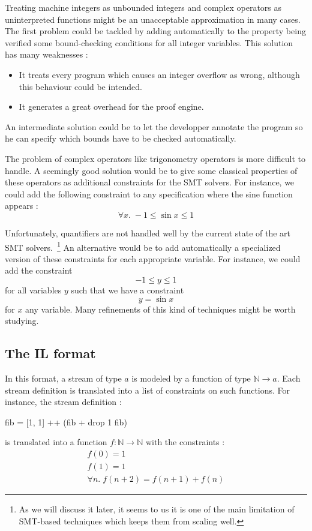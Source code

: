 Treating machine integers as unbounded integers and complex operators as uninterpreted functions might be an unacceptable approximation in many cases. The first problem could be tackled by adding automatically to the property being verified some bound-checking conditions for all integer variables. This solution has many weaknesses :

\begin{itemize}
\item It treats every program which causes an integer overflow as wrong, although this behaviour could be intended.
\item It generates a great overhead for the proof engine.
\end{itemize}

An intermediate solution could be to let the developper annotate the program so he can specify which bounds have to be checked automatically.


\medskip

The problem of complex operators like trigonometry operators is more difficult to handle. A seemingly good solution would be to give some classical properties of these operators as additional constraints for the SMT solvers. For instance, we could add the following constraint to any specification where the sine function appears : \[ \forall x . \; -1 \leq \sin x \leq 1 \]

Unfortunately, quantifiers are not handled well by the current state of the art SMT solvers.~\footnote{As we will discuss it later, it seems to us it is one of the main limitation of SMT-based techniques which keeps them from scaling well.} An alternative would be to add automatically a specialized version of these constraints for each appropriate variable. For instance, we could add the constraint \[-1 \leq y \leq 1 \] for all variables $y$ such that we have a constraint \[ y = \sin x \] for $x$ any variable. Many refinements of this kind of techniques might be worth studying.





\subsection{The \textbf{IL} format}

In this format, a stream of type $a$ is modeled by a function of type $\mathbb{N} \to a$. Each stream definition is translated into a list of constraints on such functions. For instance, the stream definition :
\begin{code}
fib = [1, 1] ++ (fib + drop 1 fib)
\end{code}
is translated into a function $f : \mathbb{N} \to \mathbb{N}$ with the constraints :
$$
\begin{array}{c}
f(0) = 1 \\
f(1) = 1 \\
\forall n . \; f(n + 2) = f(n + 1) + f(n)
\end{array}
$$


